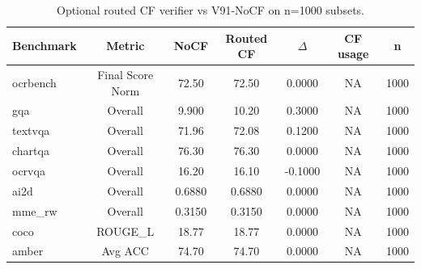 \begin{table}[t]
\centering
\begin{tabular}{lcccccc}
\toprule
Benchmark & Metric & NoCF & Routed CF & $\Delta$ & CF usage & n \\
\midrule
ocrbench & Final Score Norm & 72.50 & 72.50 & 0.0000 & NA & 1000 \\
gqa & Overall & 9.900 & 10.20 & 0.3000 & NA & 1000 \\
textvqa & Overall & 71.96 & 72.08 & 0.1200 & NA & 1000 \\
chartqa & Overall & 76.30 & 76.30 & 0.0000 & NA & 1000 \\
ocrvqa & Overall & 16.20 & 16.10 & -0.1000 & NA & 1000 \\
ai2d & Overall & 0.6880 & 0.6880 & 0.0000 & NA & 1000 \\
mme_rw & Overall & 0.3150 & 0.3150 & 0.0000 & NA & 1000 \\
coco & ROUGE_L & 18.77 & 18.77 & 0.0000 & NA & 1000 \\
amber & Avg ACC & 74.70 & 74.70 & 0.0000 & NA & 1000 \\
\bottomrule
\end{tabular}
\caption{Optional routed CF verifier vs V91-NoCF on n=1000 subsets.}
\label{tab:cf_routed_n1000}
\end{table}
